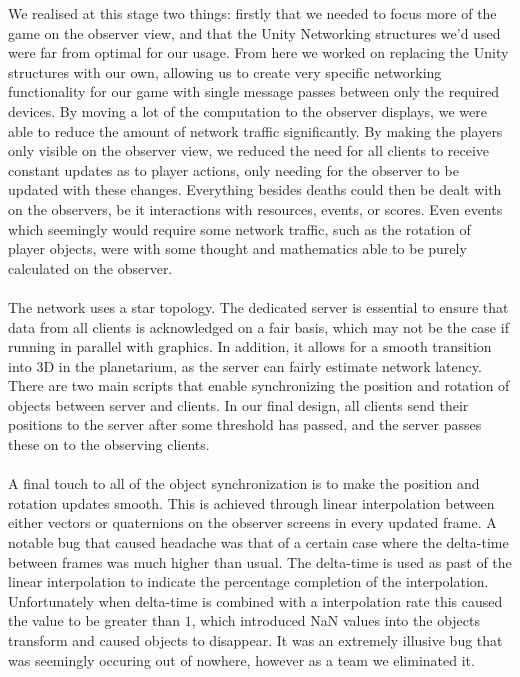 \documentclass[11pt,a4paper]{article}
\begin{document}
  \noindent
  We realised at this stage two things: firstly that we needed to focus more of the game on the observer view, and that the Unity Networking structures we'd used were far from optimal for our usage. From here we worked on replacing the Unity structures with our own, allowing us to create very specific networking functionality for our game with single message passes between only the required devices. By moving a lot of the computation to the observer displays, we were able to reduce the amount of network traffic significantly. By making the players only visible on the observer view, we reduced the need for all clients to receive constant updates as to player actions, only needing for the observer to be updated with these changes. Everything besides deaths could then be dealt with on the observers, be it interactions with resources, events, or scores. Even events which seemingly would require some network traffic, such as the rotation of player objects, were with some thought and mathematics able to be purely calculated on the observer. \\ \\
\noindent
  The network uses a star topology. The dedicated server is essential to ensure that data from all clients is acknowledged on a fair basis, which may not be the case if running in parallel with graphics. In addition, it allows for a smooth transition into 3D in the planetarium, as the server can fairly estimate network latency. There are two main scripts that enable synchronizing the position and rotation of objects between server and clients. In our final design, all clients send their positions to the server after some threshold has passed, and the server passes these on to the observing clients. \\ \\
\noindent
  A final touch to all of the object synchronization is to make the position and rotation updates smooth. This is achieved through linear interpolation between either vectors or quaternions on the observer screens in every updated frame. A notable bug that caused headache was that of a certain case where the delta-time between frames was much higher than usual. The delta-time is used as past of the linear interpolation to indicate the percentage completion of the interpolation. Unfortunately when delta-time is combined with a interpolation rate this caused the value to be greater than $1$, which introduced NaN values into the objects transform and caused objects to disappear. It was an extremely illusive bug that was seemingly occuring out of nowhere, however as a team we eliminated it.
\end{document}
